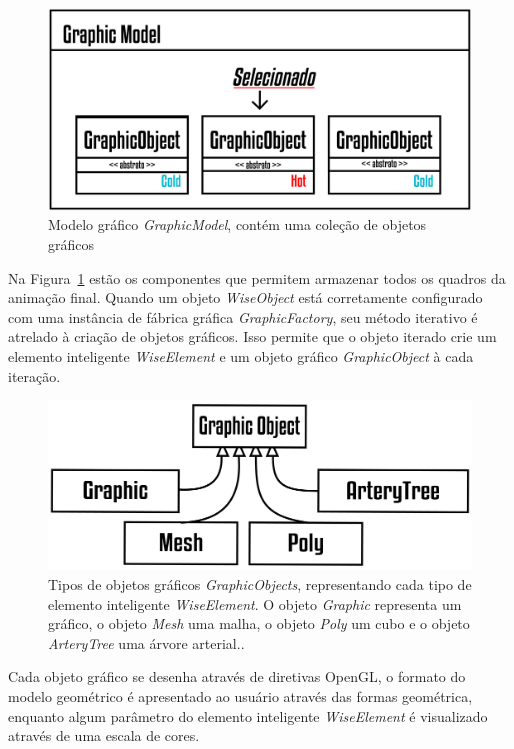 \begin{figure}[!htbp]
	\centering
	\includegraphics[scale=2]{Figures/GraphicModel@16x.png}
	\caption{Modelo gráfico \textit{GraphicModel}, contém uma coleção de objetos gráficos}
	\label{fig7:graphicmodel}
\end{figure}

Na Figura~\ref{fig7:graphicmodel} estão os componentes que permitem armazenar todos os quadros da animação final. Quando um objeto \textit{WiseObject} está corretamente configurado com uma instância de fábrica gráfica \textit{GraphicFactory}, seu método iterativo é atrelado à criação de objetos gráficos. Isso permite que o objeto iterado crie um elemento inteligente \textit{WiseElement} e um objeto gráfico \textit{GraphicObject} à cada iteração.

\begin{figure}[!htbp]
	\centering
	\includegraphics[scale=2]{Figures/GraphicObjects@16x.png}
	\caption{Tipos de objetos gráficos \textit{GraphicObjects}, representando cada tipo de elemento inteligente \textit{WiseElement}. O objeto \textit{Graphic} representa um gráfico, o objeto \textit{Mesh} uma malha, o objeto \textit{Poly} um cubo e o objeto \textit{ArteryTree} uma árvore arterial..}
	\label{fig7:graphicobjects}
\end{figure}

Cada objeto gráfico se desenha através de diretivas OpenGL, o formato do modelo geométrico é apresentado ao usuário através das formas geométrica, enquanto algum parâmetro do elemento inteligente \textit{WiseElement} é visualizado através de uma escala de cores.

